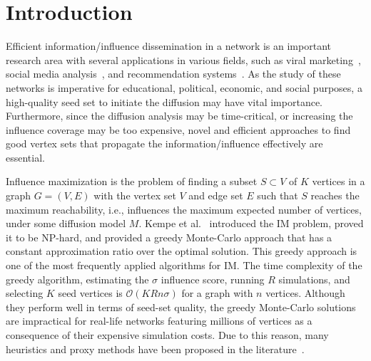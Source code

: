\documentclass[10pt,journal,compsoc]{IEEEtran}
\begin{document}
% 
% 
% 
% 
% 
% 
% 
% 
% 

\maketitle

\IEEEdisplaynontitleabstractindextext
\IEEEpeerreviewmaketitle


\ifCLASSOPTIONcompsoc
{}
\else
\section{Introduction}
\label{sec:introduction}
\fi

Efficient information/influence dissemination in a network is an important research area with several applications in various fields, such as viral marketing~\cite{leskovec2007dynamics, trusov2009effects}, social media analysis~\cite{zeng2010social, moreno2004dynamics}, and recommendation systems~\cite{lu2012recommender}.
As the study of these networks is imperative for educational, political, economic, and social purposes, a high-quality seed set to initiate the diffusion may have vital importance.
Furthermore, since the diffusion analysis may be time-critical, or increasing the influence coverage may be too expensive, novel and efficient approaches to find good vertex sets that propagate the information/influence effectively are essential.

Influence maximization is the problem of finding a subset $S \subset V$ of $K$ vertices in a graph $G = (V, E)$ with the vertex set $V$ and edge set $E$ such that $S$ reaches the maximum reachability, i.e., influences the maximum expected number of vertices, under some diffusion model $M$. Kempe et al.~\cite{kempe2003maximizing} introduced the IM problem, proved it to be NP-hard, and provided a greedy Monte-Carlo approach that has a constant approximation ratio over the optimal solution. This greedy approach is one of the most frequently applied algorithms for IM. The time complexity of the greedy algorithm, estimating the $\sigma$ influence score, running $R$ simulations, and selecting $K$ seed vertices is $\mathcal{O}(KRn\sigma)$ for a graph with $n$ vertices. Although they perform well in terms of seed-set quality, the greedy Monte-Carlo solutions are impractical for real-life networks featuring millions of vertices as a consequence of their expensive simulation costs. Due to this reason, many heuristics and proxy methods have been proposed in the literature~\cite{MixGreedy, narayanam2010shapley, kimura2007extracting, chen2010PMIA,chen2010LDAG, kim2013scalable, cohen2014sketch, goyal2011simpath, jung2012irie,cheng2014imrank,liu2014influence,galhotra2016holistic}.
\end{document}
